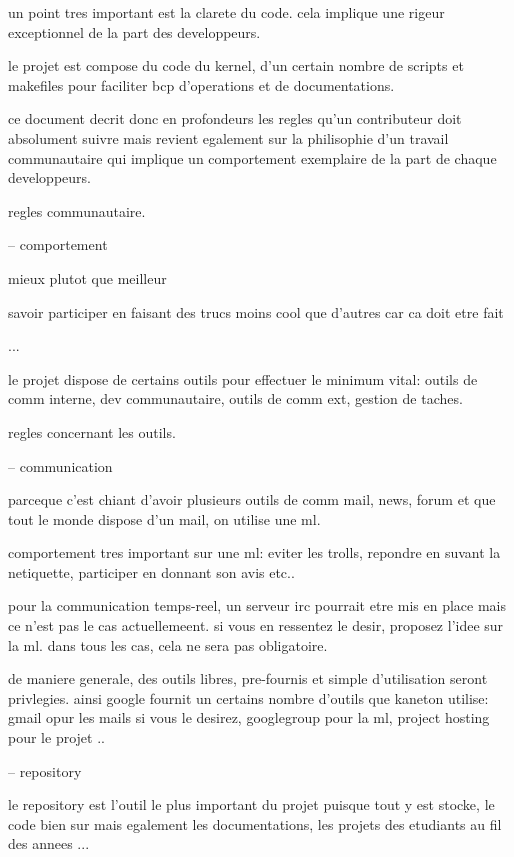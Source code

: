 {un point tres important est la clarete du code. cela implique une rigeur
exceptionnel de la part des developpeurs.

le projet est compose du code du kernel, d'un certain nombre de scripts
et makefiles pour faciliter bcp d'operations et de documentations.

ce document decrit donc en profondeurs les regles qu'un contributeur doit
absolument suivre mais revient egalement sur la philisophie d'un travail
communautaire qui implique un comportement exemplaire de la part de
chaque developpeurs.

%
%

regles communautaire.

-- comportement

mieux plutot que meilleur

savoir participer en faisant des trucs moins cool que d'autres car ca
doit etre fait

...

le projet dispose de certains outils pour effectuer le minimum vital:
outils de comm interne, dev communautaire, outils de comm ext, gestion
de taches.

%
%

regles concernant les outils.

-- communication

parceque c'est chiant d'avoir plusieurs outils de comm mail, news, forum
et que tout le monde dispose d'un mail, on utilise une ml.

comportement tres important sur une ml: eviter les trolls, repondre
en suvant la netiquette, participer en donnant son avis etc..

pour la communication temps-reel, un serveur irc pourrait etre mis en
place mais ce n'est pas le cas actuellemeent. si vous en ressentez le
desir, proposez l'idee sur la ml. dans tous les cas, cela ne sera pas
obligatoire.

de maniere generale, des outils libres, pre-fournis et simple d'utilisation
seront privlegies. ainsi google fournit un certains nombre d'outils que
kaneton utilise: gmail opur les mails si vous le desirez, googlegroup pour
la ml, project hosting pour le projet ..

-- repository

le repository est l'outil le plus important du projet puisque tout y
est stocke, le code bien sur mais egalement les documentations, les
projets des etudiants au fil des annees ...

}
